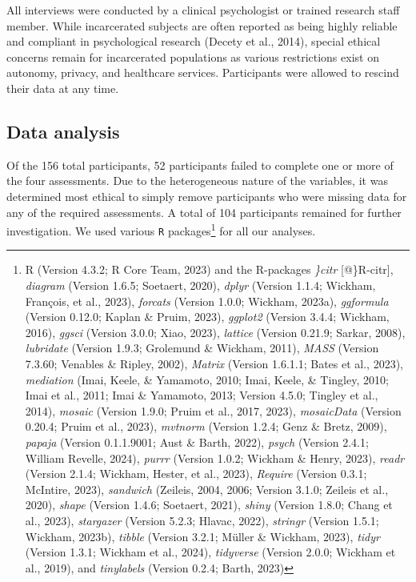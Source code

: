 \documentclass[
  man,floatsintext]{apa7}
\begin{document}
All interviews were conducted by a clinical psychologist or trained research staff member. While incarcerated subjects are often reported as being highly reliable and compliant in psychological research (Decety et al., 2014), special ethical concerns remain for incarcerated populations as various restrictions exist on autonomy, privacy, and healthcare services. Participants were allowed to rescind their data at any time.

\hypertarget{data-analysis}{%
\subsection{Data analysis}\label{data-analysis}}

Of the 156 total participants, 52 participants failed to complete one or more of the four assessments. Due to the heterogeneous nature of the variables, it was determined most ethical to simply remove participants who were missing data for any of the required assessments. A total of 104 participants remained for further investigation. We used various \texttt{R} packages\footnote{R (Version 4.3.2; R Core Team, 2023) and the R-packages \emph{\}citr} {[}@\}R-citr{]}, \emph{diagram} (Version 1.6.5; Soetaert, 2020), \emph{dplyr} (Version 1.1.4; Wickham, François, et al., 2023), \emph{forcats} (Version 1.0.0; Wickham, 2023a), \emph{ggformula} (Version 0.12.0; Kaplan \& Pruim, 2023), \emph{ggplot2} (Version 3.4.4; Wickham, 2016), \emph{ggsci} (Version 3.0.0; Xiao, 2023), \emph{lattice} (Version 0.21.9; Sarkar, 2008), \emph{lubridate} (Version 1.9.3; Grolemund \& Wickham, 2011), \emph{MASS} (Version 7.3.60; Venables \& Ripley, 2002), \emph{Matrix} (Version 1.6.1.1; Bates et al., 2023), \emph{mediation} (Imai, Keele, \& Yamamoto, 2010; Imai, Keele, \& Tingley, 2010; Imai et al., 2011; Imai \& Yamamoto, 2013; Version 4.5.0; Tingley et al., 2014), \emph{mosaic} (Version 1.9.0; Pruim et al., 2017, 2023), \emph{mosaicData} (Version 0.20.4; Pruim et al., 2023), \emph{mvtnorm} (Version 1.2.4; Genz \& Bretz, 2009), \emph{papaja} (Version 0.1.1.9001; Aust \& Barth, 2022), \emph{psych} (Version 2.4.1; William Revelle, 2024), \emph{purrr} (Version 1.0.2; Wickham \& Henry, 2023), \emph{readr} (Version 2.1.4; Wickham, Hester, et al., 2023), \emph{Require} (Version 0.3.1; McIntire, 2023), \emph{sandwich} (Zeileis, 2004, 2006; Version 3.1.0; Zeileis et al., 2020), \emph{shape} (Version 1.4.6; Soetaert, 2021), \emph{shiny} (Version 1.8.0; Chang et al., 2023), \emph{stargazer} (Version 5.2.3; Hlavac, 2022), \emph{stringr} (Version 1.5.1; Wickham, 2023b), \emph{tibble} (Version 3.2.1; Müller \& Wickham, 2023), \emph{tidyr} (Version 1.3.1; Wickham et al., 2024), \emph{tidyverse} (Version 2.0.0; Wickham et al., 2019), and \emph{tinylabels} (Version 0.2.4; Barth, 2023)} for all our analyses.
\end{document}
